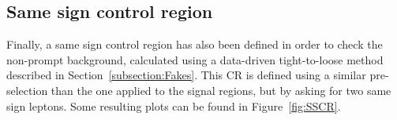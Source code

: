 \documentclass[a4paper, 10pt, openright]{report}
\begin{document}
\subsection{Same sign control region} \label{section:SSCR}

Finally, a same sign control region has also been defined in order to check the non-prompt background, calculated using a data-driven tight-to-loose method described in Section~\ref{subsection:Fakes}. This \ac{CR} is defined using a similar pre-selection than the one applied to the signal regions, but by asking for two same sign leptons. Some resulting plots can be found in Figure~\ref{fig:SSCR}.

\begin{figure}[htbp]
\centering
{}
\end{figure}
\end{document}
